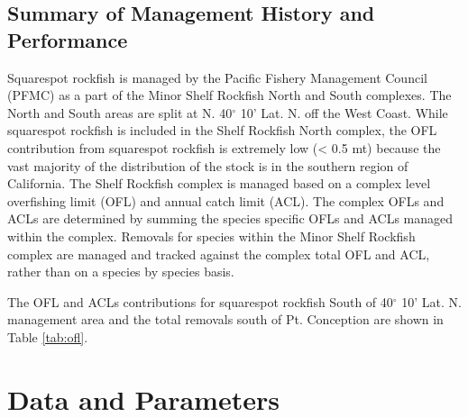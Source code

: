 \documentclass[11pt,
  english,
  a4paper,
]{article}
\begin{document}
\leavevmode\tagmcend\tagstructend\par


\hypertarget{summary-of-management-history-and-performance}{%
\subsection{Summary of Management History and Performance}\label{summary-of-management-history-and-performance}}

\leavevmode\tagmcend\tagstructend


Squarespot rockfish is managed by the Pacific Fishery Management Council (PFMC) as a part of the Minor Shelf Rockfish North and South complexes. The North and South areas are split at N. 40{\(^\circ\)\leavevmode\tagmcend\tagstructend} 10' Lat. N. off the West Coast. While squarespot rockfish is included in the Shelf Rockfish North complex, the OFL contribution from squarespot rockfish is extremely low (\textless{} 0.5 mt) because the vast majority of the distribution of the stock is in the southern region of California. The Shelf Rockfish complex is managed based on a complex level overfishing limit (OFL) and annual catch limit (ACL). The complex OFLs and ACLs are determined by summing the species specific OFLs and ACLs managed within the complex. Removals for species within the Minor Shelf Rockfish complex are managed and tracked against the complex total OFL and ACL, rather than on a species by species basis.

\leavevmode\tagmcend\tagstructend\par


The OFL and ACLs contributions for squarespot rockfish South of 40{\(^\circ\)\leavevmode\tagmcend\tagstructend} 10' Lat. N. management area and the total removals south of Pt. Conception are shown in Table \ref{tab:ofl}.

\leavevmode\tagmcend\tagstructend\par


\hypertarget{data-and-parameters}{%
\section{Data and Parameters}\label{data-and-parameters}}
\end{document}
